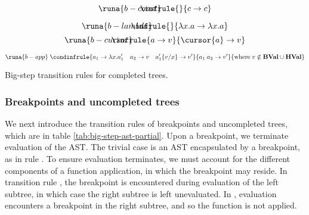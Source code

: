 \begin{table}[H]
    \centering
    \begin{adjmulticols}{2}{35pt}{-0.3in}
    \begin{equation*}
        \runa{b-const}\;\hspace{-1cm} \infrule{}{c \rightarrow c}    
    \end{equation*}
    \end{adjmulticols}
    \vspace*{-1cm}
    \begin{adjmulticols}{2}{35pt}{-0.3in}
    \begin{equation*}
        \runa{b-lambda}\;\hspace{-1cm} \infrule{}{\lambda x.a \rightarrow \lambda x.a}
    \end{equation*}\break
    \begin{equation*}
        \runa{b-cursor}\;\hspace{-1cm} \infrule{a \rightarrow v}{\cursor{a} \rightarrow v}
    \end{equation*}
    \end{adjmulticols}
    \vspace*{-1cm}
    \begin{adjmulticols}{1}{-35pt}{0.7in}
    \begin{equation*}
        \runa{b-app}\; \condinfrule{a_1 \rightarrow \lambda x.a_1' \quad a_2 \rightarrow v \quad a_1'\!\left\{v/x\right\} \rightarrow v'}{a_1\; a_2 \rightarrow v'}{\text{where}\; v \notin \mathbf{BVal} \cup \mathbf{HVal}}
    \end{equation*}
    \end{adjmulticols}
    \caption{Big-step transition rules for completed trees.}
    \label{tab:big-step-ast}
\end{table}
%
\subsubsection*{Breakpoints and uncompleted trees}
We next introduce the transition rules of breakpoints and uncompleted trees, which are in table \ref{tab:big-step-ast-partial}. Upon a breakpoint, we terminate evaluation of the AST. The trivial case is an AST encapsulated by a breakpoint, as in rule . To ensure evaluation terminates, we must account for the different components of a function application, in which the breakpoint may reside. In transition rule , the breakpoint is encountered during evaluation of the left subtree, in which case the right subtree is left unevaluated. In , evaluation encounters a breakpoint in the right subtree, and so the function is not applied.\\

